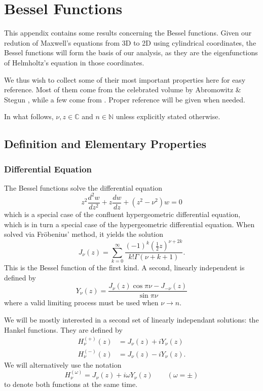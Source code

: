 \chapter{Bessel Functions}
This appendix contains some results concerning the 
Bessel functions. Given our redution of Maxwell's equations 
from 3D to 2D using cylindrical coordinates, the 
Bessel functions will form the basis of our analysis, 
as they are the eigenfunctions of
Helmholtz's equation in those coordinates.

We thus wish to collect some of their most important
properties here for easy reference. Most of them come from the celebrated
volume by Abromowitz \& Stegun \cite{ABR1965}, while a few
come from \cite{CUY2008}. Proper reference will be given when needed. 

In what follows, $\nu,z\in\mathbb{C}$ and $n\in\mathbb{N}$ unless explicitly
stated otherwise.

\section{Definition and Elementary Properties}

\subsection{Differential Equation}
The Bessel functions solve the differential equation
  \begin{equation}
   \label{eq:app.Bessel.diffEquation}
   z^2\frac{d^2w}{dz^2}+z\frac{dw}{dz}+(z^2-\nu^2)w=0
  \end{equation}
which is a special case of the confluent hypergeometric
differential equation, which is in turn a special case
of the hypergeometric differential equation. When solved
via Fröbenius' method, it yields the solution
  \begin{equation}
   \label{eq:app.Bessel.seriesJ}
   J_\nu(z) = \sum_{k=0}^\infty \frac{(-1)^k\left(\frac{1}{2}z\right)^{\nu+2k}}{k!\Gamma(\nu+k+1)}.
  \end{equation}
This is the Bessel function of the first kind. A second, linearly independent
is defined by
  \begin{equation}
   Y_\nu(z) = \frac{J_\nu(z)\cos\pi\nu-J_{-\nu}(z)}{\sin\pi\nu}
  \end{equation}
where a valid limiting process must be used when $\nu\rightarrow n$. 

We will be mostly interested in a second set of linearly independant
solutions: the Hankel functions. They are defined by 
  \begin{subequations}
  \label{eq:app.Bessel.hankelDef}
  \begin{align}
   H_\nu^{(+)}(z)	&= J_\nu(z)+iY_\nu(z)	\\
   H_\nu^{(-)}(z)	&= J_\nu(z)-iY_\nu(z).
  \end{align}
  \end{subequations}
We will alternatively use the notation
  \begin{equation}
   H_\nu^{(\omega)} = J_\nu(z)+i\omega Y_\nu(z)\qquad (\omega=\pm)
  \end{equation}
to denote both functions at the same time.

